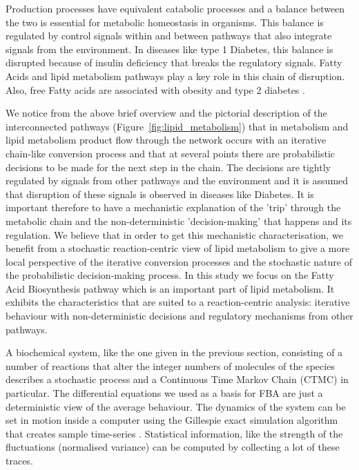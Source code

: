 Production processes have equivalent catabolic
processes and a balance between the two is essential for metabolic
homeostasis in organisms. This balance is regulated by control signals
within and
between pathways that also integrate signals from the
environment. In diseases like type 1 Diabetes, this balance is
disrupted because of insulin deficiency that breaks the regulatory
signals. Fatty Acids and lipid metabolism pathways play a key role
in this chain of disruption. Also, free Fatty acids are
associated with obesity and type 2 diabetes \cite [] {boden2002free}.

We notice from the above brief overview and the pictorial description
of the interconnected pathways (Figure~\ref{fig:lipid_metabolism}) that
in metabolism and lipid metabolism product flow through the
network occurs with an iterative chain-like conversion process and that at
several points there are probabilistic decisions to be made for the next step in the
chain. The decisions are tightly regulated by signals from other
pathways and the environment and it is assumed that disruption of these signals is
observed in diseases like Diabetes. It is important therefore to have
a mechanistic explanation of the 'trip' through the metabolic chain
and the non-deterministic 'decision-making' that happens and its regulation. We believe
that in order to get this mechanistic characterisation, we
benefit from a stochastic reaction-centric view of lipid metabolism to
give a more local perspective of the iterative conversion processes
and the stochastic nature of the probabilistic
decision-making process. In this study we
focus on the Fatty Acid Biosynthesis pathway which is an important
part of lipid metabolism. It exhibits the characteristics that are
suited to a reaction-centric analysis: iterative behaviour with
non-deterministic decisions and regulatory mechanisms from other pathways.

A biochemical system, like the one given in the previous section,
consisting of a number of reactions that alter the integer numbers of
molecules of the species describes a stochastic process and a Continuous
Time Markov Chain (CTMC) in particular. The differential equations we used as
a basis for FBA are just a
deterministic view of the average behaviour. The dynamics of the
system can be set in motion inside a computer using the Gillespie
exact simulation algorithm that creates sample
time-series \cite [] {gillespie1977exact}. Statistical information, like the strength of the
fluctuations (normalised variance) can be computed by collecting a lot
of these traces.

